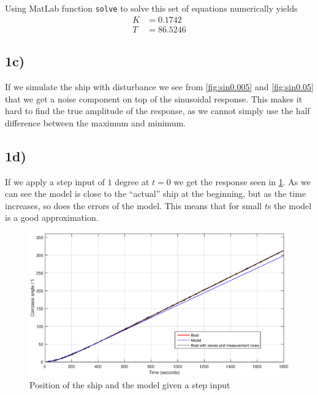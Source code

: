 Using MatLab function \texttt{solve} to solve this set of equations numerically yields
\begin{subequations}
	\begin{align}
		K &= 0.1742 \\
		T &= 86.5246
	\end{align}
\end{subequations}

\subsection{1c)}

If we simulate the ship with disturbance we see from \cref{fig:sin0.005}  and \cref{fig:sin0.05} that we get a noise component on top of the sinusoidal response. This makes it hard to find the true amplitude of the response, as we cannot simply use the half difference between the maximum and minimum.

\subsection{1d)}

If we apply a step input of $1$ degree at $t=0$ we get the response seen in \cref{fig:step_1}. As we can see the model is close to the ``actual'' ship at the beginning, but as the time increases, so does the errors of the model. This means that for small $t$s the model is a good approximation.

\begin{figure}
	\centering
	\includegraphics[width=\textwidth]{images/oppg1/step1_with_model_trafu.eps}
	\caption{Position of the ship and the model given a step input}
	\label{fig:step_1}
\end{figure}
